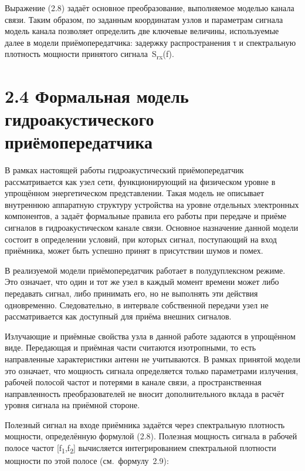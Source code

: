 Выражение (2.8) задаёт основное преобразование, выполняемое моделью
канала связи. Таким образом, по заданным координатам узлов и параметрам
сигнала модель канала позволяет определить две ключевые величины,
используемые далее в модели приёмопередатчика: задержку распространения
τ и спектральную плотность мощности принятого
сигнала~S\textsubscript{rx}(f).

\section*{2.4 Формальная модель гидроакустического
приёмопередатчика}\label{ux444ux43eux440ux43cux430ux43bux44cux43dux430ux44f-ux43cux43eux434ux435ux43bux44c-ux433ux438ux434ux440ux43eux430ux43aux443ux441ux442ux438ux447ux435ux441ux43aux43eux433ux43e-ux43fux440ux438ux451ux43cux43eux43fux435ux440ux435ux434ux430ux442ux447ux438ux43aux430}

В рамках настоящей работы гидроакустический приёмопередатчик
рассматривается как узел сети, функционирующий на физическом уровне в
упрощённом энергетическом представлении. Такая модель не описывает
внутреннюю аппаратную структуру устройства на уровне отдельных
электронных компонентов, а задаёт формальные правила его работы при
передаче и приёме сигналов в гидроакустическом канале связи. Основное
назначение данной модели состоит в определении условий, при которых
сигнал, поступающий на вход приёмника, может быть успешно принят в
присутствии шумов и помех.

В реализуемой модели приёмопередатчик работает в полудуплексном режиме.
Это означает, что один и тот же узел в каждый момент времени может либо
передавать сигнал, либо принимать его, но не выполнять эти действия
одновременно. Следовательно, в интервале собственной передачи узел не
рассматривается как доступный для приёма внешних сигналов.

Излучающие и приёмные свойства узла в данной работе задаются в
упрощённом виде. Передающая и приёмная части считаются изотропными, то
есть направленные характеристики антенн не учитываются. В рамках
принятой модели это означает, что мощность сигнала определяется только
параметрами излучения, рабочей полосой частот и потерями в канале связи,
а пространственная направленность преобразователей не вносит
дополнительного вклада в расчёт уровня сигнала на приёмной стороне.

Полезный сигнал на входе приёмника задаётся через спектральную плотность
мощности, определённую формулой (2.8). Полезная мощность сигнала в
рабочей полосе частот {[}f\textsubscript{1},f\textsubscript{2}{]}
вычисляется интегрированием спектральной плотности мощности по этой
полосе (см.~формулу~2.9):

